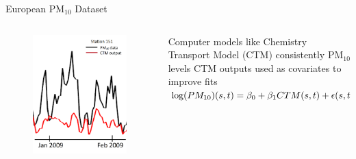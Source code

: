 \begin{frame}{European PM$_{10}$ Dataset}
\begin{columns}[T] %
\begin{column}{.48\textwidth}
\begin{figure}
\centering
\includegraphics[scale=0.15]{../figures/ctmtest.png}
\end{figure}
\end{column}%
\hfill%
\begin{column}{.48\textwidth}
\vskip 0.5in
\begin{itemize}
\myitem Computer models like Chemistry Transport Model (CTM) consistently  PM$_{10}$ levels
\myitem CTM outputs used as covariates to improve fits
$\log(PM_{10})(s,t) =\beta_0 +\beta_1 CTM(s,t) + \epsilon(s,t)$\end{itemize}
\end{column}%
\end{columns}
\end{frame}

